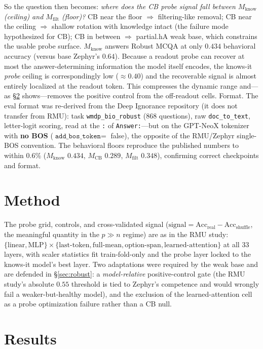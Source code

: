 \documentclass[11pt]{article}
\newcommand{\Acc}{\mathrm{Acc}}
\newcommand{\Mcb}{M_{\mathrm{CB}}}
\newcommand{\Mknows}{M_{\mathrm{know}}}
\newcommand{\Mnever}{M_{\mathrm{filt}}}
\begin{document}
So the question then becomes: \emph{where does the CB probe signal fall between $\Mknows$ (ceiling) and
$\Mnever$ (floor)?} CB near the floor $\Rightarrow$ filtering-like removal; CB near the ceiling
$\Rightarrow$ shallow rotation with knowledge intact (the failure mode hypothesized for CB);
CB in between $\Rightarrow$ partial.hA weak base, which constrains the usable probe surface. $\Mknows$ answers Robust
MCQA at only $0.434$ behavioral accuracy (versus base Zephyr's $0.64$). Because a readout probe
can recover at most the answer-determining information the model itself encodes, the knows-it
\emph{probe} ceiling is correspondingly low ($\approx 0.40$) and the recoverable signal is
almost entirely localized at the readout token. This compresses the dynamic range and---as
\S\ref{sec:grid} shows---removes the positive control from the off-readout cells. Format. The eval format was re-derived from the Deep Ignorance repository (it does
not transfer from RMU): task \texttt{wmdp\_bio\_robust} (868 questions), raw \texttt{doc\_to\_text},
letter-logit scoring, read at the \texttt{:} of \texttt{Answer:}---but on the GPT-NeoX tokenizer
with \textbf{no BOS} ($\texttt{add\_bos\_token}=$ false), the opposite of the RMU/Zephyr
single-BOS convention. The behavioral floors reproduce the published numbers to within $0.6\%$
($\Mknows$ $0.434$, $\Mcb$ $0.289$, $\Mnever$ $0.348$), confirming correct checkpoints and
format.

\newpage

\section{Method}
 
The probe grid, controls, and cross-validated signal ($\text{signal} = \Acc_{\text{real}} -
\Acc_{\text{shuffle}}$, the meaningful quantity in the $p\!\gg\!n$ regime) are as in the RMU
study: $\{\text{linear},\text{MLP}\}\times\{\text{last-token},\text{full-mean},\text{option-span},
\text{learned-attention}\}$ at all 33 layers, with scaler statistics fit train-fold-only and the
probe layer locked to the knows-it model's best layer. Two adaptations were required by the
weak base and are defended in \S\ref{sec:robust}: a \emph{model-relative} positive-control gate
(the RMU study's absolute $0.55$ threshold is tied to Zephyr's competence and would wrongly fail
a weaker-but-healthy model), and the exclusion of the learned-attention cell as a probe
optimization failure rather than a CB null.

\section{Results}
\label{sec:grid}
 
\end{document}

